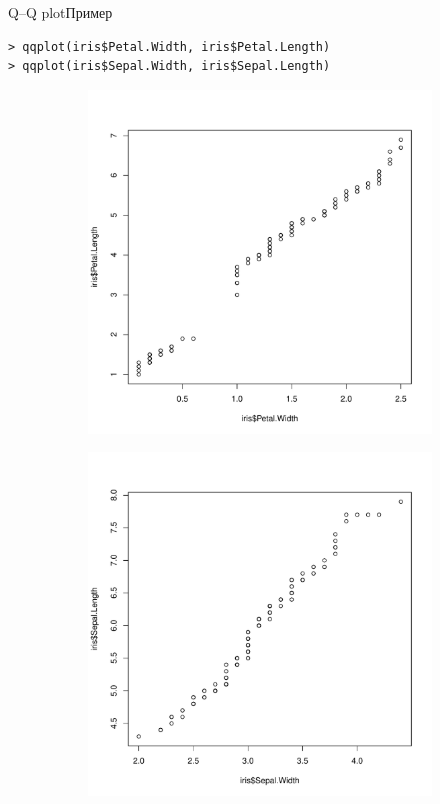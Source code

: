 \documentclass[hyperref={unicode}, xcolor={svgnames, table},
usepdftitle=false]{beamer}
\theoremstyle{remark}
\begin{document}
\begin{frame}[fragile]{Q--Q plot}{Пример}
\begin{verbatim}
> qqplot(iris$Petal.Width, iris$Petal.Length)
> qqplot(iris$Sepal.Width, iris$Sepal.Length)
\end{verbatim}
  \begin{figure}
    \centering
    \begin{subfigure}[b]{.45\linewidth}
      \includegraphics[width=\textwidth]{QQ_Petal_Sizes.pdf}
    \end{subfigure}
    \begin{subfigure}[b]{.45\linewidth}
      \includegraphics[width=\textwidth]{QQ_Sepal_Sizes.pdf}
    \end{subfigure}
  \end{figure}
\end{frame}
\end{document}
